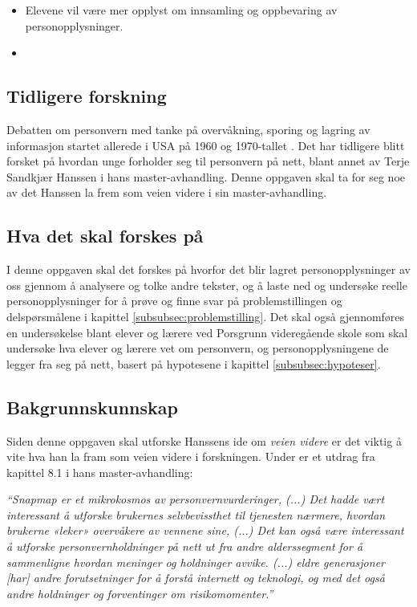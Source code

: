 \begin{itemize}
    \item Elevene vil være mer opplyst om innsamling og oppbevaring av personopplysninger.
    \item 
\end{itemize}

\subsection{Tidligere forskning}
Debatten om personvern med tanke på overvåkning, sporing og lagring av informasjon startet allerede i USA på 1960 og 1970-tallet \parencite[36]{bok:nissenbaum}. Det har tidligere blitt forsket på hvordan unge forholder seg til personvern på nett, blant annet av Terje Sandkjær Hanssen i hans master-avhandling. Denne oppgaven skal ta for seg noe av det Hanssen la frem som veien videre i sin master-avhandling. \parencite{master:hanssen}

\subsection{Hva det skal forskes på}
I denne oppgaven skal det forskes på hvorfor det blir lagret personopplysninger av oss gjennom å analysere og tolke andre tekster, og å laste ned og undersøke reelle personopplysninger for å prøve og finne svar på problemstillingen og delspørsmålene i kapittel \ref{subsubsec:problemstilling}. Det skal også gjennomføres en undersøkelse blant elever og lærere ved Porsgrunn videregående skole som skal undersøke hva elever og lærere vet om personvern, og personopplysningene de legger fra seg på nett, basert på hypotesene i kapittel \ref{subsubsec:hypoteser}.

\subsection{Bakgrunnskunnskap}
Siden denne oppgaven skal utforske Hanssens ide om \textit{veien videre} er det viktig å vite hva han la fram som veien videre i forskningen. Under er et utdrag fra kapittel 8.1 i hans master-avhandling:

\textit{``Snapmap er et mikrokosmos av personvernvurderinger, (...) Det hadde vært interessant å utforske brukernes selvbevissthet til tjenesten nærmere, hvordan brukerne «leker» overvåkere av vennene sine, (...) Det kan også være interessant å utforske personvernholdninger på nett ut fra andre alderssegment for å sammenligne hvordan meninger og holdninger avvike. (...) eldre generasjoner [har] andre forutsetninger for å forstå internett og teknologi, og med det også andre holdninger og forventinger om risikomomenter.''} \parencite[69]{master:hanssen}

\newpage